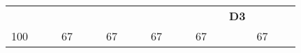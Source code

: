 \begin{landscape}
\begin{table}[h!]
\begin{tabular}{lcllcllcllcllcllcl}
\multicolumn{1}{l|}{}     & \multicolumn{1}{c|}{}                                                                                                   &                              & \multicolumn{1}{l|}{}   & \multicolumn{1}{c|}{}                                                                                                      &                               & \multicolumn{1}{l|}{}   & \multicolumn{1}{c|}{}                                                                                                   &                               & \multicolumn{1}{l|}{}   & \multicolumn{1}{c|}{}                                                                                            &                               & \multicolumn{1}{l|}{}   & \multicolumn{1}{c|}{}                                                                                                              & {\bf D3}                      & \multicolumn{1}{l|}{}   & \multicolumn{1}{c|}{}                                                                                                        &                               \\ \cline{1-1} \cline{3-4} \cline{6-7} \cline{9-10} \cline{12-13} \cline{15-16} \cline{18-18} 
\multicolumn{1}{|l|}{100} & \multicolumn{1}{c|}{}                                                                                                   & \multicolumn{1}{l|}{}        & \multicolumn{1}{l|}{67} & \multicolumn{1}{c|}{}                                                                                                      & \multicolumn{1}{l|}{}         & \multicolumn{1}{l|}{67} & \multicolumn{1}{c|}{}                                                                                                   & \multicolumn{1}{l|}{}         & \multicolumn{1}{l|}{67} & \multicolumn{1}{c|}{}                                                                                            & \multicolumn{1}{l|}{}         & \multicolumn{1}{l|}{67} & \multicolumn{1}{c|}{}                                                                                                              & \multicolumn{1}{l|}{}         & \multicolumn{1}{l|}{67} & \multicolumn{1}{c|}{}                                                                                                        & \multicolumn{1}{l|}{}         \\ \hline

\end{tabular}
\end{table}
\end{landscape}
